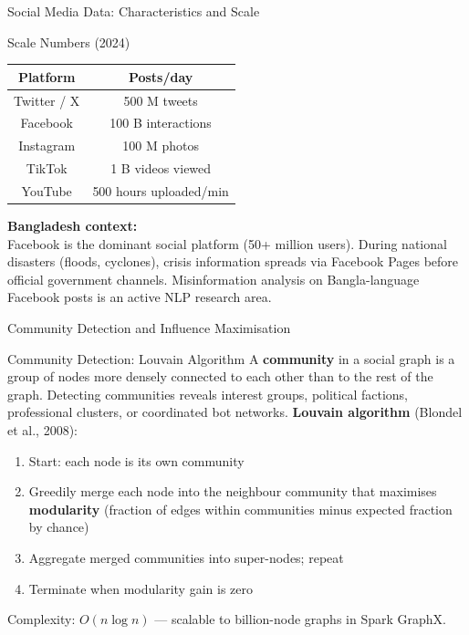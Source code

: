 \documentclass[aspectratio=169,10pt]{beamer}
\begin{document}
\begin{frame}{Social Media Data: Characteristics and Scale}
 
      \begin{exampleblock}{Scale Numbers (2024)}
        {\small
        \renewcommand{\arraystretch}{1.3}
        \begin{tabular}{|c|c|}
          \toprule
          \textbf{Platform} & \textbf{Posts/day} \\
          \midrule
          Twitter / X    & 500 M tweets \\
          Facebook       & 100 B interactions \\
          Instagram      & 100 M photos \\
          TikTok         & 1 B videos viewed \\
          YouTube        & 500 hours uploaded/min \\
          \bottomrule
        \end{tabular}
        } 
        \end{exampleblock}

         \textbf{Bangladesh context:}\\
        {\small Facebook is the dominant social platform (50+ million users).  During national disasters (floods, cyclones), crisis information spreads via Facebook Pages before official government channels.  Misinformation analysis on Bangla-language Facebook posts is an active NLP research area.}

 
\end{frame}
\begin{frame}{Community Detection and Influence Maximisation}
 
      \begin{block}{Community Detection: Louvain Algorithm}
        A \textbf{community} in a social graph is a group of nodes more densely connected to each other than to the rest of the graph.  Detecting communities reveals interest groups, political factions, professional clusters, or coordinated bot networks.
        \vspace{4pt}
        \textbf{Louvain algorithm} (Blondel et al., 2008):
        \begin{enumerate}
          \item Start: each node is its own community
          \item Greedily merge each node into the neighbour community that maximises \textbf{modularity} (fraction of edges within communities minus expected fraction by chance)
          \item Aggregate merged communities into super-nodes; repeat
          \item Terminate when modularity gain is zero
        \end{enumerate}
        Complexity: $O(n \log n)$ --- scalable to billion-node graphs in Spark GraphX.
      \end{block}
 
\end{frame}
\end{document}
